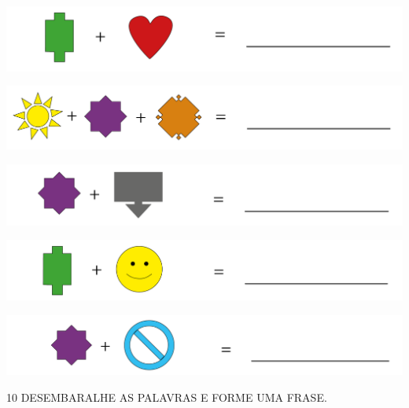 \begin{escolha}
\item \includegraphics[width=.95\textwidth]{media/flag2a.png}
\item \includegraphics[width=.95\textwidth]{media/flag2b.png}
\item \includegraphics[width=.95\textwidth]{media/flag2c.png}
\item \includegraphics[width=.95\textwidth]{media/flag2d.png}
\item \includegraphics[width=.95\textwidth]{media/flag2e.png}
\end{escolha}


\pagebreak

\num{10} DESEMBARALHE AS PALAVRAS E FORME UMA FRASE.

